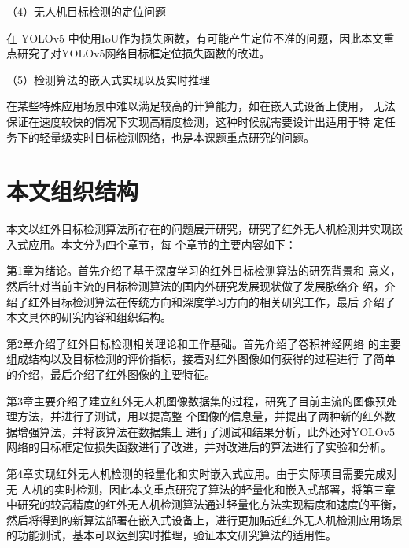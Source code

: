 （4）无人机目标检测的定位问题

在 YOLOv5 中使用IoU作为损失函数，有可能产生定位不准的问题，因此本文重点研究了对YOLOv5网络目标框定位损失函数的改进。

（5）检测算法的嵌入式实现以及实时推理

在某些特殊应用场景中难以满足较高的计算能力，如在嵌入式设备上使用，
无法保证在速度较快的情况下实现高精度检测，这种时候就需要设计出适用于特
定任务下的轻量级实时目标检测网络，也是本课题重点研究的问题。

\section{本文组织结构}
本文以红外目标检测算法所存在的问题展开研究，研究了红外无人机检测并实现嵌入式应用。本文分为四个章节，每
个章节的主要内容如下：

第1章为绪论。首先介绍了基于深度学习的红外目标检测算法的研究背景和
意义，然后针对当前主流的目标检测算法的国内外研究发展现状做了发展脉络介
绍，介绍了红外目标检测算法在传统方向和深度学习方向的相关研究工作，最后
介绍了本文具体的研究内容和组织结构。

第2章介绍了红外目标检测相关理论和工作基础。首先介绍了卷积神经网络
的主要组成结构以及目标检测的评价指标，接着对红外图像如何获得的过程进行
了简单的介绍，最后介绍了红外图像的主要特征。

第3章主要介绍了建立红外无人机图像数据集的过程，研究了目前主流的图像预处理方法，并进行了测试，用以提高整
个图像的信息量，并提出了两种新的红外数据增强算法，并将该算法在数据集上
进行了测试和结果分析，此外还对YOLOv5网络的目标框定位损失函数进行了改进，并对改进后的算法进行了实验和分析。

第4章实现红外无人机检测的轻量化和实时嵌入式应用。由于实际项目需要完成对无
人机的实时检测，因此本文重点研究了算法的轻量化和嵌入式部署，将第三章中研究的较高精度的红外无人机检测算法通过轻量化方法实现精度和速度的平衡，然后将得到的新算法部署在嵌入式设备上，进行更加贴近红外无人机检测应用场景的功能测试，基本可以达到实时推理，验证本文研究算法的适用性。


